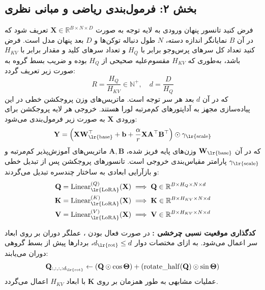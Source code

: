 \subsection*{بخش ۲: فرمول‌بندی ریاضی و مبانی نظری }
فرض کنید تانسور پنهان ورودی به لایه توجه به صورت $\mathbf{X} \in \mathbb{R}^{B \times N \times D}$ تعریف شود که در آن $B$ نمایانگر اندازه دسته، $N$ طول دنباله توکن‌ها و $D$ بعد پنهان مدل است. فرض کنید تعداد کل سرهای پرس‌وجو برابر با $H_Q$ و تعداد سرهای کلید و مقدار برابر با $H_{KV}$ باشد، به‌طوری که $H_{KV}$ مقسوم‌علیه صحیحی از $H_Q$ بوده و ضریب بسط گروه به صورت زیر تعریف گردد:
\begin{equation}
R = \frac{H_Q}{H_{KV}} \in \mathbb{N}^+, \quad d = \frac{D}{H_Q}
\end{equation}
که در آن $d$ بعد هر سر توجه است. ماتریس‌های وزن پروجکشن خطی در این پیاده‌سازی مجهز به آداپتورهای کم‌مرتبه لورا  هستند. خروجی هر لایه پروجکشن برای ورودی $\mathbf{X}$ به صورت زیر فرمول‌بندی می‌شود:
\begin{equation}
\mathbf{Y} = \left( \mathbf{X} \mathbf{W}_{\text{\lr{base}}}^\top + \mathbf{b} + \frac{\alpha}{r} \mathbf{X} \mathbf{A}^\top \mathbf{B}^\top \right) \odot \gamma_{\text{\lr{scale}}}
\end{equation}
که در آن $\mathbf{W}_{\text{\lr{base}}}$ وزن‌های پایه فریز شده، $\mathbf{A}, \mathbf{B}$ ماتریس‌های آموزش‌پذیر کم‌مرتبه و $\gamma_{\text{\lr{scale}}}$ پارامتر مقیاس‌بندی خروجی است. تانسورهای پروجکشن پس از تبدیل خطی و بازآرایی ابعادی به ساختار چندسره تبدیل می‌گردند:
\begin{align}
\mathbf{Q} &= \operatorname{Linear}_{\text{\lr{LoRA}}}^{(Q)}(\mathbf{X}) \implies \mathbf{Q} \in \mathbb{R}^{B \times H_Q \times N \times d} \\
\mathbf{K} &= \operatorname{Linear}_{\text{\lr{LoRA}}}^{(K)}(\mathbf{X}) \implies \mathbf{K} \in \mathbb{R}^{B \times H_{KV} \times N \times d} \\
\mathbf{V} &= \operatorname{Linear}_{\text{\lr{LoRA}}}^{(V)}(\mathbf{X}) \implies \mathbf{V} \in \mathbb{R}^{B \times H_{KV} \times N \times d}
\end{align}

\textbf{کدگذاری موقعیت نسبی چرخشی :}
در صورت فعال بودن ، عملگر دوران بر روی ابعاد سر اعمال می‌شود. به ازای مختصات دوار $d_{\text{\lr{rot}}} \le d$، بردارها پیش از بسط گروهی دوران می‌یابند:
\begin{equation}
\mathbf{Q}_{:, :, :, :d_{\text{\lr{rot}}}} \leftarrow (\mathbf{Q} \odot \cos\boldsymbol{\Theta}) + (\operatorname{rotate\_half}(\mathbf{Q}) \odot \sin\boldsymbol{\Theta})
\end{equation}
عملیات مشابهی به طور همزمان بر روی $\mathbf{K}$ با ابعاد $H_{KV}$ اعمال می‌گردد.

